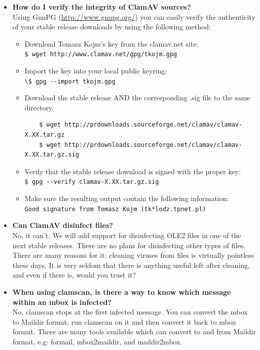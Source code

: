 \documentclass[a4paper,titlepage,12pt]{article}
\begin{document}
\begin{itemize}
	\item \textbf{How do I verify the integrity of ClamAV sources?}\\
	Using GnuPG (\url{http://www.gnupg.org/}) you can easily verify the
	authenticity of your stable release downloads by using the following
	method:
	\begin{itemize}
	\item Download Tomasz Kojm's key from the clamav.net site:\\
	\verb+$ wget http://www.clamav.net/gpg/tkojm.gpg+
	\item Import the key into your local public keyring:\\
	\verb+\$ gpg --import tkojm.gpg+
	\item Download the stable release AND the corresponding .sig file to
	the same directory.\\
	\begin{verbatim}
	$ wget http://prdownloads.sourceforge.net/clamav/clamav-X.XX.tar.gz
	$ wget http://prdownloads.sourceforge.net/clamav/clamav-X.XX.tar.gz.sig
	\end{verbatim}
	\item Verify that the stable release download is signed with the proper
	key:\\
	\verb+$ gpg --verify clamav-X.XX.tar.gz.sig+
	\item Make sure the resulting output contain the following
	information:\\
	\verb+Good signature from Tomasz Kojm (tk*lodz.tpnet.pl)+
	\end{itemize}

	\item \textbf{Can ClamAV disinfect files?}\\
	No, it can't. We will add support for disinfecting OLE2 files in one
	of the next stable releases. There are no plans for disinfecting other
	types of files. There are many reasons for it: cleaning viruses from
	files is virtually pointless these days. It is very seldom that there
	is anything useful left after cleaning, and even if there is,
	would you trust it?

	\item \textbf{When using clamscan, is there a way to know which message
	within an mbox is infected?}\\
	No, clamscan stops at the first infected message. You can convert the
	mbox to Maildir format, run clamscan on it and then convert it back to
	mbox format. There are many tools available which can convert to and
	from Maildir format, e.g: formail, mbox2maildir, and maildir2mbox.


\end{itemize}
\end{document}
